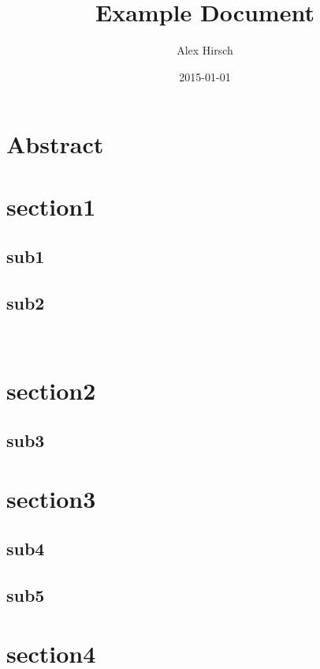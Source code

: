 \documentclass[book]{uibk}
\title{Example Document}
\author{Alex Hirsch}
\date{2015-01-01}
\begin{document}
\frontmatter

\maketitle

\chapter*{Abstract}
\label{ch:abstract}

\lipsum[1]

\tableofcontents

\mainmatter

\chapter{section1}
\label{ch:section1}

\lipsum[1]

\section{sub1}
\label{sec:sub1}

\lipsum[1-3]

\section{sub2}
\label{sec:sub2}

\lipsum[1-3]~\cite{wiki:denuvo}

\chapter{section2}
\label{ch:section2}

\lipsum[1]

\section{sub3}
\label{sec:sub3}

\lipsum[1-5]

\chapter{section3}
\label{ch:section3}

\lipsum[1]

\section{sub4}
\label{sec:sub4}

\lipsum[1-2]

\section{sub5}
\label{sec:sub5}

\lipsum[1-2]

\chapter{section4}
\label{ch:section4}

\lipsum[1-3]

\backmatter

\printbibliography
\end{document}
